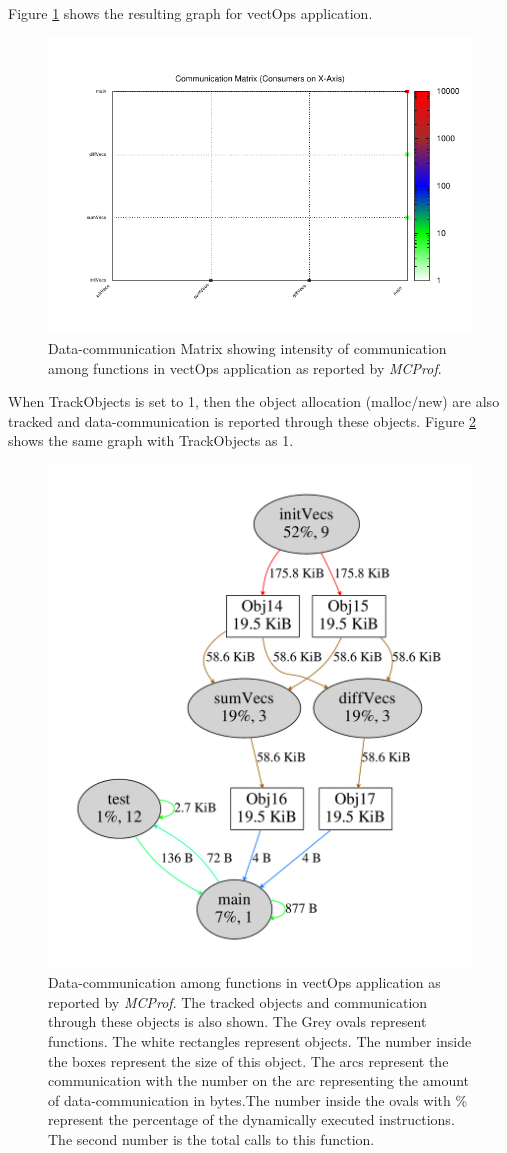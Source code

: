 \documentclass[10pt]{article}
\newcommand{\MCPROF}{\emph{MCProf}}
\begin{document}
Figure \ref{fig:matrix} shows the resulting graph for vectOps application.

\begin{figure}[!h]
\centering
\includegraphics[width=0.95\linewidth]{figures/matrix.pdf}
\caption{Data-communication Matrix showing intensity of communication
    among functions in vectOps application as reported by \MCPROF{}.}
\label{fig:matrix}
\end{figure}


When TrackObjects is set to 1, then the object allocation (malloc/new) are
also tracked and data-communication is reported through these objects. 
Figure \ref{fig:commWithObjects} shows the same graph with TrackObjects as 1.

\begin{figure}[!h]
\centering
\includegraphics[width=0.55\linewidth]{figures/commWithObjects.pdf}
\caption{Data-communication among functions in vectOps application as reported
    by \MCPROF{}. The tracked objects and communication through these objects
    is also shown. The Grey ovals represent functions. The white rectangles
    represent objects. The number inside the boxes represent the size of this
    object. The arcs represent the communication with the number on
    the arc representing the amount of data-communication in bytes.The number
    inside the ovals with \% represent the percentage of the dynamically
    executed instructions. The second number is the total calls to this function.}
\label{fig:commWithObjects}
\end{figure}
\end{document}

